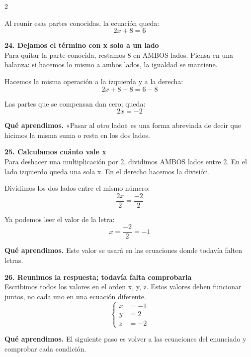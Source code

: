 \documentclass[11pt,a4paper,landscape]{article}
\begin{document}
\begin{multicols*}{2}
\begin{minipage}{\linewidth}
\par\smallskip Al reunir esas partes conocidas, la ecuación queda:
\[2x + 8=6\]
\end{minipage}\par\medskip
\noindent\begin{minipage}{\linewidth}\textbf{24. Dejamos el término con x solo a un lado}\\[2pt]Para quitar la parte conocida, restamos 8 en AMBOS lados. Piensa en una balanza: si hacemos lo mismo a ambos lados, la igualdad se mantiene.
\par\smallskip Hacemos la misma operación a la izquierda y a la derecha:
\[2x + 8 - 8=6 - 8\]
\par\smallskip Las partes que se compensan dan cero; queda:
\[2x=-2\]
\par\smallskip\textbf{Qué aprendimos.} «Pasar al otro lado» es una forma abreviada de decir que hicimos la misma suma o resta en los dos lados.
\end{minipage}\par\medskip
\noindent\begin{minipage}{\linewidth}\textbf{25. Calculamos cuánto vale x}\\[2pt]Para deshacer una multiplicación por 2, dividimos AMBOS lados entre 2. En el lado izquierdo queda una sola x. En el derecho hacemos la división.
\par\smallskip Dividimos los dos lados entre el mismo número:
\[\frac{2x}{2}=\frac{-2}{2}\]
\par\smallskip Ya podemos leer el valor de la letra:
\[x=\frac{-2}{2}=-1\]
\par\smallskip\textbf{Qué aprendimos.} Este valor se usará en las ecuaciones donde todavía falten letras.
\end{minipage}\par\medskip
\noindent\begin{minipage}{\linewidth}\textbf{26. Reunimos la respuesta; todavía falta comprobarla}\\[2pt]Escribimos todos los valores en el orden x, y, z. Estos valores deben funcionar juntos, no cada uno en una ecuación diferente.
\[\left\{\begin{aligned}x&=-1\\y&=2\\z&=-2\end{aligned}\right.\]
\par\smallskip\textbf{Qué aprendimos.} El siguiente paso es volver a las ecuaciones del enunciado y comprobar cada condición.
\end{minipage}\par\medskip

\end{multicols*}
\end{document}
